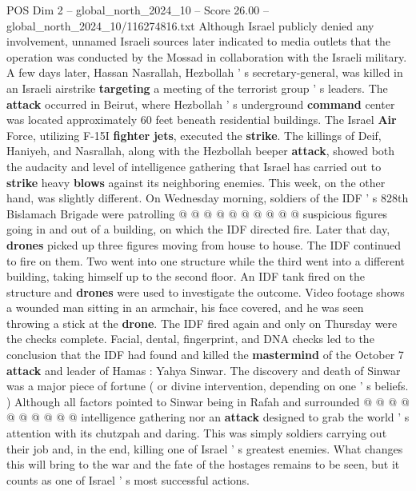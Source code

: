 \begin{textsample}{POS Dim 2 – global\_north\_2024\_10 – Score 26.00 – global\_north\_2024\_10/116274816.txt}
Although Israel publicly denied any involvement, unnamed Israeli sources later indicated to media outlets that the operation was conducted by the Mossad in collaboration with the Israeli military.
A few days later, Hassan Nasrallah, Hezbollah ' s secretary-general, was killed in an Israeli airstrike \textbf{targeting} a meeting of the terrorist group ' s leaders.
The \textbf{attack} occurred in Beirut, where Hezbollah ' s underground \textbf{command} center was located approximately 60 feet beneath residential buildings.
The Israel \textbf{Air} Force, utilizing F-15I \textbf{fighter} \textbf{jets}, executed the \textbf{strike}.
The killings of Deif, Haniyeh, and Nasrallah, along with the Hezbollah beeper \textbf{attack}, showed both the audacity and level of intelligence gathering that Israel has carried out to \textbf{strike} heavy \textbf{blows} against its neighboring enemies.
This week, on the other hand, was slightly different.
On Wednesday morning, soldiers of the IDF ' s 828th Bislamach Brigade were patrolling @ @ @ @ @ @ @ @ @ @ suspicious figures going in and out of a building, on which the IDF directed fire.
Later that day, \textbf{drones} picked up three figures moving from house to house.
The IDF continued to fire on them.
Two went into one structure while the third went into a different building, taking himself up to the second floor.
An IDF tank fired on the structure and \textbf{drones} were used to investigate the outcome.
Video footage shows a wounded man sitting in an armchair, his face covered, and he was seen throwing a stick at the \textbf{drone}.
The IDF fired again and only on Thursday were the checks complete.
Facial, dental, fingerprint, and DNA checks led to the conclusion that the IDF had found and killed the \textbf{mastermind} of the October 7 \textbf{attack} and leader of Hamas : Yahya Sinwar.
The discovery and death of Sinwar was a major piece of fortune ( or divine intervention, depending on one ' s beliefs. ) Although all factors pointed to Sinwar being in Rafah and surrounded @ @ @ @ @ @ @ @ @ @ intelligence gathering nor an \textbf{attack} designed to grab the world ' s attention with its chutzpah and daring.
This was simply soldiers carrying out their job and, in the end, killing one of Israel ' s greatest enemies.
What changes this will bring to the war and the fate of the hostages remains to be seen, but it counts as one of Israel ' s most successful actions.

\end{textsample}

